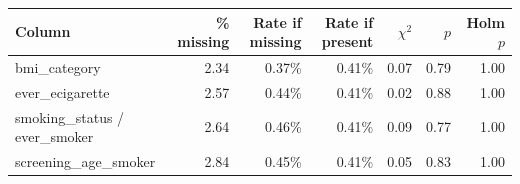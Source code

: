 \begin{tabular}{lrrrrrr}
\toprule
Column & \% missing & Rate if missing & Rate if present & $\chi^2$ & $p$ & Holm $p$ \\
\midrule
bmi\_category & 2.34 & 0.37\% & 0.41\% & 0.07 & 0.79 & 1.00 \\
ever\_ecigarette & 2.57 & 0.44\% & 0.41\% & 0.02 & 0.88 & 1.00 \\
smoking\_status / ever\_smoker & 2.64 & 0.46\% & 0.41\% & 0.09 & 0.77 & 1.00 \\
screening\_age\_smoker & 2.84 & 0.45\% & 0.41\% & 0.05 & 0.83 & 1.00 \\
\bottomrule
\end{tabular}
